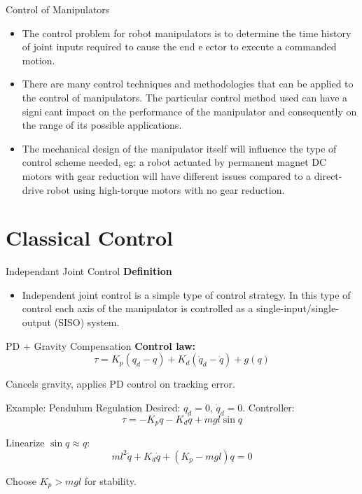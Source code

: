 \documentclass{beamer}
\begin{document}
	\begin{frame}{Control of Manipulators}
			\begin{itemize}
			\item The control problem for robot manipulators is to determine the time
			history of joint inputs required to cause the end eector to execute a commanded
			motion.
			\item There are many control techniques and methodologies that can be applied
			to the control of manipulators. The particular control method used
			can have a signicant impact on the performance of the manipulator and
			consequently on the range of its possible applications.
			\item The mechanical design of the manipulator itself will influence 			the type of control scheme needed, eg: a robot actuated by permanent magnet DC motors
			with gear reduction will have different issues compared to a direct-drive robot using high-torque motors with no gear reduction. 
		\end{itemize}
	\end{frame}
	
	\section{Classical Control}
	\begin{frame}{Independant Joint Control}
		\textbf{Definition}
		\begin{itemize}
			\item Independent joint control is a simple type of control strategy. In this type of control each axis of the manipulator
			is controlled as a single-input/single-output (SISO) system.
		\end{itemize}
	
	\end{frame}
	\begin{frame}{PD + Gravity Compensation}
		\textbf{Control law:}
		\[
		\tau = K_p (q_d - q) + K_d (\dot q_d - \dot q) + g(q)
		\]
		
		\begin{noteBox}
			Cancels gravity, applies PD control on tracking error.
		\end{noteBox}
	\end{frame}
	
	\begin{frame}{Example: Pendulum Regulation}
		Desired: $q_d=0$, $\dot q_d=0$. Controller:
		\[
		\tau = -K_p q - K_d \dot q + m g l \sin q
		\]
		
		Linearize $\sin q \approx q$:
		\[
		m l^2 \ddot q + K_d \dot q + (K_p - m g l) q = 0
		\]
		
		Choose $K_p > m g l$ for stability.
	\end{frame}
	
\end{document}
